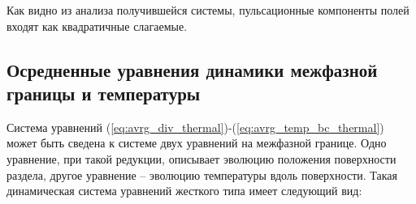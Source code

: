 \documentclass[12pt,a4paper]{article}
\begin{document}
Как видно из анализа получившейся системы, пульсационные компоненты полей входят как квадратичные слагаемые.

\subsection{Осредненные уравнения динамики межфазной границы и температуры}

Система уравнений (\ref{eq:avrg_div_thermal})-(\ref{eq:avrg_temp_bc_thermal}) может быть сведена к системе двух уравнений на межфазной границе. Одно уравнение, при такой редукции, описывает эволюцию положения поверхности раздела, другое уравнение -- эволюцию температуры вдоль поверхности. Такая динамическая система уравнений жесткого типа имеет следующий вид:

\end{document}
